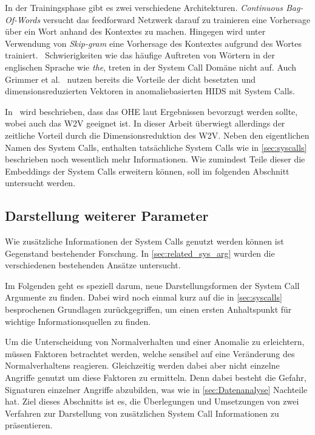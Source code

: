                 In der Trainingsphase gibt es zwei verschiedene Architekturen.
                \textit{Continuous Bag-Of-Words} versucht das feedforward Netzwerk darauf zu trainieren eine Vorhersage über ein Wort anhand des Kontextes zu machen.
                Hingegen wird unter Verwendung von \textit{Skip-gram} eine Vorhersage des Kontextes aufgrund des Wortes trainiert.~\cite{EMBEDDINGPILEHVAR2020}
                Schwierigkeiten wie das häufige Auftreten von Wörtern in der englischen Sprache wie \textit{the}, treten in der System Call Domäne nicht auf.
                Auch Grimmer et al.~\cite{IDSTHREADGRIMMER2021} nutzen bereits die Vorteile der dicht besetzten und dimensionsreduzierten Vektoren in anomaliebasierten \ac{HIDS} mit System Calls.\par\medskip

            In~\cite{W2VWUNDERLICH2019} wird beschrieben, dass das \ac{OHE} laut Ergebnissen bevorzugt werden sollte, wobei auch das \ac{W2V} geeignet ist.
            In dieser Arbeit überwiegt allerdings der zeitliche Vorteil durch die Dimensionsreduktion des \ac{W2V}.
            Neben den eigentlichen Namen des System Calls, enthalten tatsächliche System Calls wie in \autoref{sec:syscalls} beschrieben noch wesentlich mehr Informationen.
            Wie zumindest Teile dieser die Embeddings der System Calls erweitern können, soll im folgenden Abschnitt untersucht werden.

        \subsection{Darstellung weiterer Parameter}\label{sec:Meta}
                Wie zusätzliche Informationen der System Calls genutzt werden können ist Gegenstand bestehender Forschung.
                In \autoref{sec:related_sys_arg} wurden die verschiedenen bestehenden Ansätze untersucht.\par\medskip

                Im Folgenden geht es speziell darum, neue Darstellungsformen der System Call Argumente zu finden.
                Dabei wird noch einmal kurz auf die in \autoref{sec:syscalls} besprochenen Grundlagen zurückgegriffen, um einen ersten Anhaltspunkt für wichtige Informationsquellen zu finden.\par\medskip

                Um die Unterscheidung von Normalverhalten und einer Anomalie zu erleichtern, müssen Faktoren betrachtet werden, welche sensibel auf eine Veränderung des Normalverhaltens reagieren.
                Gleichzeitig werden dabei aber nicht einzelne Angriffe genutzt um diese Faktoren zu ermitteln.
                Denn dabei besteht die Gefahr, Signaturen einzelner Angriffe abzubilden, was wie in \autoref{sec:Datenanalyse} Nachteile hat.
                Ziel dieses Abschnitts ist es, die Überlegungen und Umsetzungen von zwei Verfahren zur Darstellung von zusätzlichen System Call Informationen zu präsentieren.

